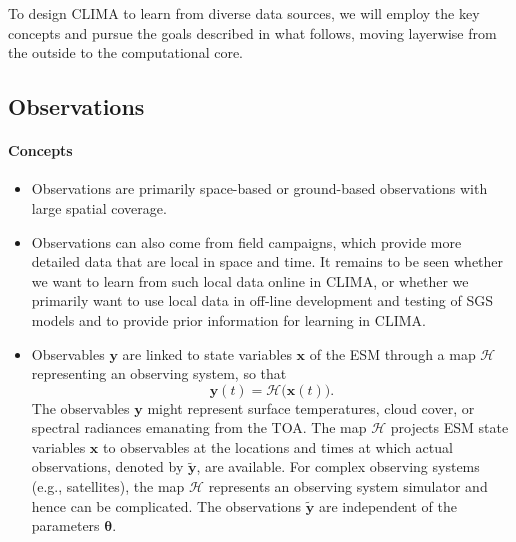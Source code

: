 \documentclass{article}
\renewcommand{\vec}[1]{\boldsymbol{{#1}}}
\begin{document}
To design CLIMA to learn from diverse data sources, we will employ the key concepts and pursue the goals described in what follows, moving layerwise from the outside to the computational core.

\subsection{Observations}

\paragraph{Concepts}
\begin{itemize}
    \item Observations are primarily space-based or ground-based observations with large spatial coverage.
    \item Observations can also come from field campaigns, which provide more detailed data that are local in space and time. It remains to be seen whether we want to learn from such local data online in CLIMA, or whether we primarily want to use local data in off-line development and testing of SGS models and to provide prior information for learning in CLIMA.
    \item Observables $\vec{y}$ are linked to state variables $\vec{x}$ of the ESM through a map $\mathcal{H}$ representing an observing system, so that 
    \begin{equation}
    \vec{y}(t)=\mathcal{H}\bigl(\vec{x}(t)\bigr).
    \end{equation}
    The observables $\vec{y}$ might represent surface temperatures, cloud cover, or spectral radiances emanating from the TOA. The map $\mathcal{H}$ projects ESM state variables $\vec{x}$ to observables at the locations and times at which actual observations, denoted by $\vec{\tilde y}$, are available. For complex observing systems (e.g., satellites), the map $\mathcal{H}$ represents an observing system simulator and hence can be complicated. The observations $\vec{\tilde y}$ are independent of the parameters $\vec{\theta}$.
\end{itemize}
\end{document}
